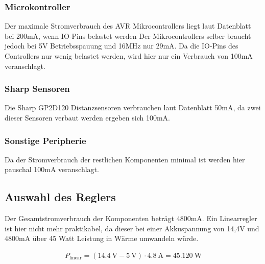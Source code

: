 

\subsubsection{Microkontroller}
Der maximale Stromverbrauch des AVR Mikrocontrollers liegt laut Datenblatt\cite{ds-at90can} bei 200mA, wenn IO-Pins belastet werden
Der Mikrocontrollers selber braucht jedoch bei 5V Betriebsspauung und 16MHz nur 29mA. Da die IO-Pins des Controllers nur wenig belastet werden,
wird hier nur ein Verbrauch von 100mA veranschlagt.

\subsubsection{Sharp Sensoren}
Die Sharp GP2D120 Distanzsensoren verbrauchen laut Datenblatt \cite{ds-sharp-GP2D120} 50mA, da zwei dieser Sensoren verbaut werden ergeben sich 100mA.

\subsubsection{Sonstige Peripherie}
Da der Stromverbrauch der restlichen Komponenten minimal ist werden hier pauschal 100mA veranschlagt.

\subsection{Auswahl des Reglers}
Der Gesamtstromverbrauch der Komponenten beträgt 4800mA. Ein Linearregler ist hier nicht mehr praktikabel, da dieser bei einer Akkuspannung von 14,4V und 4800mA über 45 Watt Leistung in Wärme umwandeln würde.

\begin{align*}
P_{\text{linear}}=(\SI{14,4}{\V}-\SI{5}{\V})\cdot \SI{4,8}{\A}=\SI{45,120}{\W}
\end{align*}

